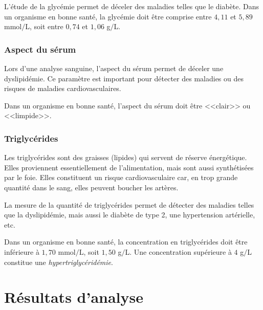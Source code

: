 \documentclass[12pt]{article}
\begin{document}
	L'étude de la glycémie permet de déceler des maladies telles que le diabète. Dans un organisme en bonne santé, la glycémie doit être comprise entre $4,11$ et $5,89$ mmol$/$L, soit entre $0,74$ et $1,06$ g$/$L.
	
		\subsubsection{Aspect du sérum}
	Lors d'une analyse sanguine, l'aspect du sérum permet de déceler une dyslipidémie. Ce paramètre est important pour détecter des maladies ou des risques de maladies cardiovasculaires.
	
	Dans un organisme en bonne santé, l'aspect du sérum doit être <<clair>> ou <<limpide>>.
	
		\subsubsection{Triglycérides}
	Les triglycérides sont des graisses (lipides) qui servent de réserve énergétique. Elles proviennent essentiellement de l'alimentation, mais sont aussi synthétisées par le foie. Elles constituent un risque cardiovasculaire car, en trop grande quantité dans le sang, elles peuvent boucher les artères.
	
	La mesure de la quantité de triglycérides permet de détecter des maladies telles que la dyslipidémie, mais aussi le diabète de type 2, une hypertension artérielle, etc.
	
	Dans un organisme en bonne santé, la concentration en triglycérides doit être inférieure à $1,70$ mmol$/$L, soit $1,50$ g$/$L. Une concentration supérieure à $4$ g$/$L constitue une \textit{hypertriglycéridémie}.
	
	
	
	
	
	
	
\newpage
\section{Résultats d'analyse}
\end{document}
